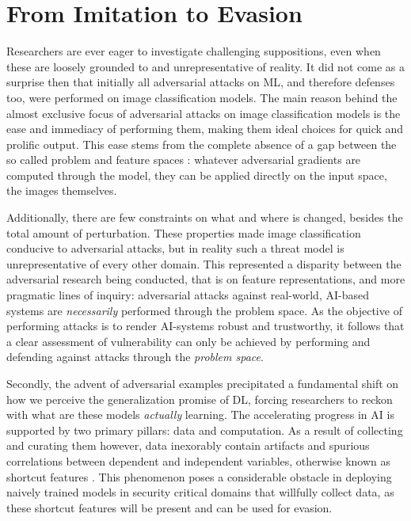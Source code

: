 \section{From Imitation to Evasion}

Researchers are ever eager to investigate challenging suppositions, even when these are loosely grounded to and unrepresentative of reality.
It did not come as a surprise then that initially all adversarial attacks on \gls{ML}, and therefore defenses too, were performed on image classification models.
The main reason behind the almost exclusive focus of adversarial attacks on image classification models  is the ease and immediacy of performing them, making them ideal choices for quick and prolific output.
This ease stems from the complete absence of a gap between the so called problem and feature spaces \cite{pierazzi2020intriguing}: whatever adversarial gradients are computed through the model, they can be applied directly on the input space, the images themselves.

Additionally, there are few constraints on what and where is changed, besides the total amount of perturbation.
These properties made image classification conducive to adversarial attacks, but in reality such a threat model is unrepresentative of every other domain.
This represented a disparity between the adversarial research being conducted, that is on feature representations, and more pragmatic lines of inquiry:
adversarial attacks against real-world, AI-based systems are \textit{necessarily} performed through the problem space.
As the objective of performing attacks is to render AI-systems robust and trustworthy, it follows that a clear assessment of vulnerability can only be achieved by performing and defending against attacks through the \textit{problem space}.

Secondly, the advent of adversarial examples precipitated a fundamental shift on how we perceive the generalization promise of \gls{DL}, forcing researchers to reckon with what are these models \textit{actually} learning.
The accelerating progress in \gls{AI} is supported by two primary pillars: data and computation.
As a result of collecting and curating them however, data inexorably contain artifacts and spurious correlations between dependent and independent variables, otherwise known as shortcut features \cite{geirhos2020shortcut}.
This phenomenon poses a considerable obstacle in deploying naively trained models in security critical domains that willfully collect data, as these shortcut features will be present and can be used for evasion.

